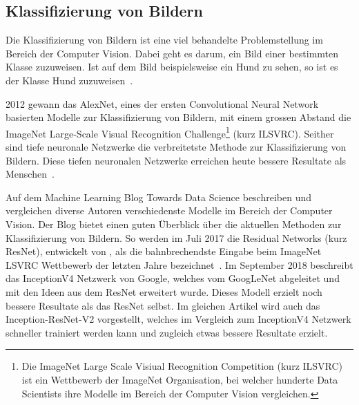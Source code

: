

\newpage
\subsection{Klassifizierung von Bildern}
\label{chap:image-classification}

Die Klassifizierung von Bildern ist eine viel behandelte Problemstellung im Bereich der Computer Vision. Dabei geht es darum, ein Bild einer bestimmten Klasse zuzuweisen. Ist auf dem Bild beispielsweise ein Hund zu sehen, so ist es der Klasse Hund zuzuweisen~\autocite{Goodfellow2016}.

2012 gewann das AlexNet, eines der ersten Convolutional Neural Network basierten Modelle zur Klassifizierung von Bildern, mit einem grossen Abstand die ImageNet Large-Scale Visual Recognition Challenge\footnote{Die ImageNet Large Scale Visiual Recognition Competition (kurz ILSVRC) ist ein Wettbewerb der ImageNet Organisation, bei welcher hunderte Data Scientists ihre Modelle im Bereich der Computer Vision vergleichen.} (kurz ILSVRC). Seither sind tiefe neuronale Netzwerke die verbreitetste Methode zur Klassifizierung von Bildern. Diese tiefen neuronalen Netzwerke erreichen heute bessere Resultate als Menschen~\autocite{SSD}.

Auf dem Machine Learning Blog Towards Data Science beschreiben und vergleichen diverse Autoren verschiedenste Modelle im Bereich der Computer Vision. Der Blog bietet einen guten Überblick über die aktuellen Methoden zur Klassifizierung von Bildern. So werden im Juli 2017 die Residual Networks (kurz ResNet), entwickelt von \textcite{He2015}, als die bahnbrechendste Eingabe beim ImageNet LSVRC Wettbewerb der letzten Jahre bezeichnet~\autocite{Fungg2017ResNet}. Im September 2018 beschreibt \textcite{SHTsuang2018Inception} das InceptionV4 Netzwerk von Google, welches vom GoogLeNet abgeleitet und mit den Ideen aus dem ResNet erweitert wurde. Dieses Modell erzielt noch bessere Resultate als das ResNet selbst. Im gleichen Artikel wird auch das Inception-ResNet-V2 vorgestellt, welches im Vergleich zum InceptionV4 Netzwerk schneller trainiert werden kann und zugleich etwas bessere Resultate erzielt. 

